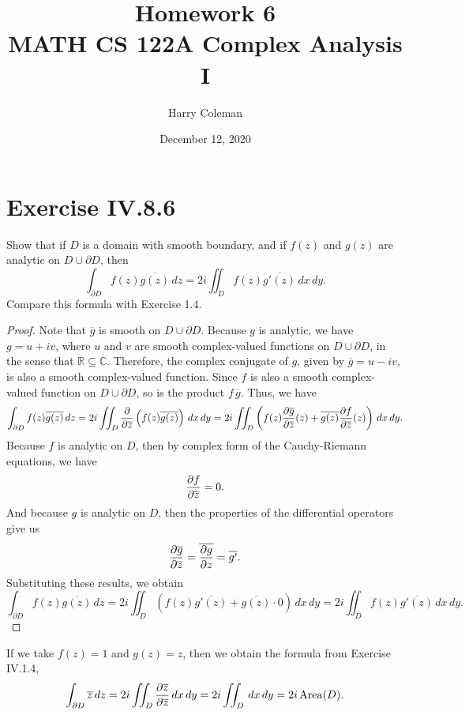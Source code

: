 \documentclass[12pt]{article}
\newenvironment{problem}
    {\begin{lrbox}{\mybox}\begin{minipage}{0.98\textwidth}}
    {\end{minipage}\end{lrbox}\framebox[\textwidth]{\usebox{\mybox}}}
\newcommand{\R}{\mathbb{R}}
\newcommand{\C}{\mathbb{C}}
\newcommand{\bd}{\partial}
\newcommand{\conj}[1]{\overline{#1}}
\newcommand{\pd}[3][1]{\ifx1#1{\frac{\partial #2}{\partial#3}}\else{\frac{\partial^{#1}#2}{\partial#3^{#1}}}\fi}
\begin{document}
 
\title{Homework 6\\
    \large MATH CS 122A Complex Analysis I
}
\author{Harry Coleman}
\date{December 12, 2020}
\maketitle

\section{Exercise IV.8.6}
\begin{problem}
    Show that if $D$ is a domain with smooth boundary, and if $f(z)$ and $g(z)$ are analytic on $D \cup \bd D$, then
    \[
        \int_{\bd D} f(z) \conj{g(z)} \,dz = 2i \iint_D f(z) \conj{g'(z)} \,dx \,dy.
    \]
    Compare this formula with Exercise 1.4.
\end{problem}

\begin{proof}
    Note that $\conj{g}$ is smooth on $D \cup \bd D$. Because $g$ is analytic, we have $g = u + iv$, where $u$ and $v$ are smooth complex-valued functions on $D \cup \bd D$, in the sense that $\R \subseteq \C$. Therefore, the complex conjugate of $g$, given by $\conj{g} = u - iv$, is also a smooth complex-valued function. Since $f$ is also a smooth complex-valued function on $D \cup \bd D$, so is the product $f \, \conj{g}$. Thus, we have
    \[
        \int_{\bd D} f(z) \conj{g(z)} \,dz 
            = 2i \iint_{D} \pd{}{\conj{z}} \left( f(z) \conj{g(z)} \right) \,dx \,dy
            = 2i \iint_{D} \left( f(z) \pd{\conj{g}}{\conj{z}}(z) + \conj{g(z)} \pd{f}{\conj{z}}(z) \right) \,dx \,dy.
    \]
    Because $f$ is analytic on $D$, then by complex form of the Cauchy-Riemann equations, we have
    \[
        \pd{f}{\conj{z}} = 0.
    \]
    And because $g$ is analytic on $D$, then the properties of the differential operators give us
    \[
         \pd{\conj{g}}{\conj{z}} = \conj{\pd{g}{z}} = \conj{g'}.
    \]
    Substituting these results, we obtain
    \[
        \int_{\bd D} f(z) \conj{g(z)} \,dz
            = 2i \iint_{D} \left( f(z) \conj{g'(z)} + \conj{g(z)} \cdot 0 \right) \,dx \,dy
            = 2i \iint_{D} f(z) \conj{g'(z)} \,dx \,dy.
    \]
    
\end{proof}

If we take $f(z) = 1$ and $g(z) = z$, then we obtain the formula from Exercise IV.1.4,
\[
    \int_{\bd D} \conj{z} \,dz = 2i \iint_{D} \pd{\conj{z}}{\conj{z}} \,dx \,dy = 2i \iint_{D} \,dx \,dy = 2i \operatorname{Area}(D).
\]
\end{document}
